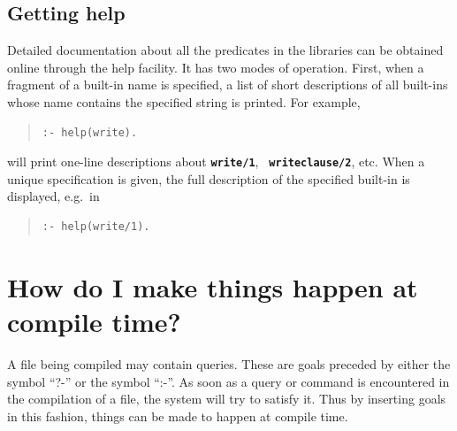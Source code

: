\subsection{Getting help}
Detailed documentation about all the predicates in the {\eclipse} libraries
can be obtained online through the help facility.
It has two modes of operation.
First, when a fragment of a built-in name is specified, a list of short
descriptions of all built-ins whose name contains the specified string
is printed.
For example,
\begin{quote}
\begin{verbatim}
:- help(write).
\end{verbatim}
\end{quote}
will print one-line descriptions about {\bf \tt write/1}, {\bf \tt
writeclause/2}, etc.
When a unique specification is given, the full description of the
specified built-in is displayed, e.g.\ in
\begin{quote}
\begin{verbatim}
:- help(write/1).
\end{verbatim}
\end{quote}

\section{How do I make things happen at compile time?}

A file being compiled may contain queries.  These are goals
preceded by either the symbol ``?-'' or the symbol ``:-''.
As soon as a query or command is encountered in the compilation of a file,
the {\eclipse} system will try to satisfy it.
Thus by inserting goals in this fashion, things can be made to happen at
compile time.

